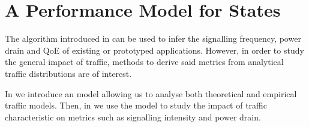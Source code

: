 \section{A Performance Model for   States}\label{sec:network:performance_model}
The algorithm introduced in  can be used to infer the signalling frequency, power drain and \gls{QoE} of existing or prototyped applications.
However, in order to study the general impact of traffic, methods to derive said metrics from analytical traffic distributions are of interest.

In  we introduce an model allowing us to 
analyse both theoretical and empirical traffic models.
Then, in  we use the model to study the impact of traffic characteristic on metrics such as signalling intensity and power drain.



